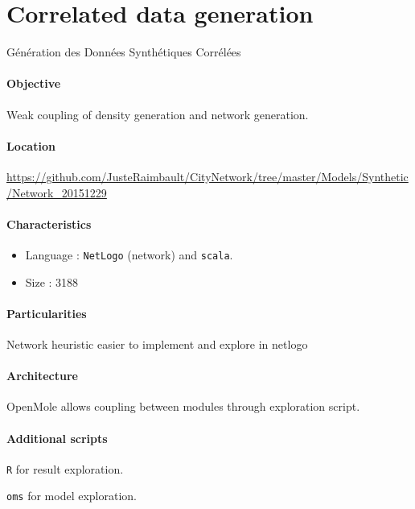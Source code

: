 \section{Correlated data generation}{Génération des Données Synthétiques Corrélées}

\paragraph{Objective}

Weak coupling of density generation and network generation.

\paragraph{Location}

\url{https://github.com/JusteRaimbault/CityNetwork/tree/master/Models/Synthetic/Network_20151229}

\paragraph{Characteristics}

\begin{itemize}
\item Language : \texttt{NetLogo} (network) and \texttt{scala}.
\item Size : 3188
\end{itemize}


\paragraph{Particularities}

Network heuristic easier to implement and explore in netlogo

\paragraph{Architecture}

OpenMole allows coupling between modules through exploration script.

\paragraph{Additional scripts}

\texttt{R} for result exploration.

\texttt{oms} for model exploration.





